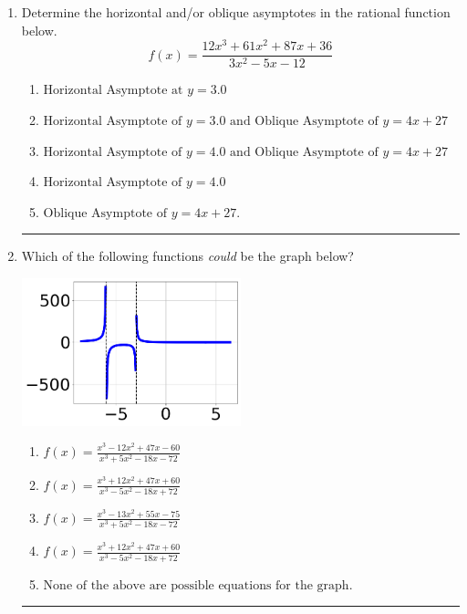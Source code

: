 \documentclass[14pt]{extbook}
\newcommand{\litem}[1]{\item#1\hspace*{-1cm}\rule{\textwidth}{0.4pt}}
\begin{document}
\begin{enumerate}
{\begin{enumerate}[label=\Alph*.]
\end{enumerate} }
\litem{
Determine the horizontal and/or oblique asymptotes in the rational function below.\[ f(x) = \frac{12x^{3} +61 x^{2} +87 x + 36}{3x^{2} -5 x -12} \]\begin{enumerate}[label=\Alph*.]
\item \( \text{Horizontal Asymptote at } y = 3.0 \)
\item \( \text{Horizontal Asymptote of } y = 3.0 \text{ and Oblique Asymptote of } y = 4x + 27 \)
\item \( \text{Horizontal Asymptote of } y = 4.0 \text{ and Oblique Asymptote of } y = 4x + 27 \)
\item \( \text{Horizontal Asymptote of } y = 4.0  \)
\item \( \text{Oblique Asymptote of } y = 4x + 27. \)

\end{enumerate} }
\litem{
Which of the following functions \textit{could} be the graph below?
\begin{center}
    \includegraphics[width=0.5\textwidth]{../Figures/identifyGraphOfRationalFunctionB.png}
\end{center}
\begin{enumerate}[label=\Alph*.]
\item \( f(x)=\frac{x^{3} -12 x^{2} +47 x -60}{x^{3} +5 x^{2} -18 x -72} \)
\item \( f(x)=\frac{x^{3} +12 x^{2} +47 x + 60}{x^{3} -5 x^{2} -18 x + 72} \)
\item \( f(x)=\frac{x^{3} -13 x^{2} +55 x -75}{x^{3} +5 x^{2} -18 x -72} \)
\item \( f(x)=\frac{x^{3} +12 x^{2} +47 x + 60}{x^{3} -5 x^{2} -18 x + 72} \)
\item \( \text{None of the above are possible equations for the graph.} \)

\end{enumerate} }
\end{enumerate}
\end{document}
